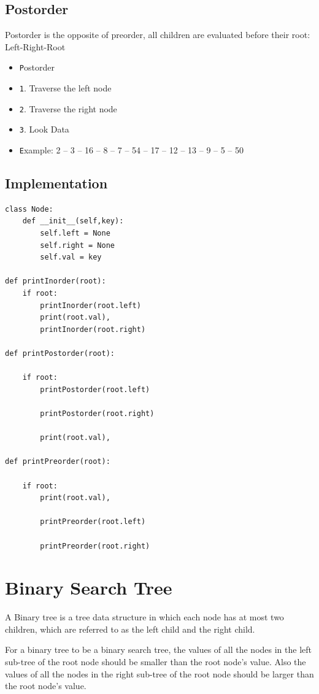 \documentclass[12pt]{article}
\begin{document}
    \subsection{Postorder}
    Postorder is the opposite of preorder, all children are evaluated before their root: Left-Right-Root
    \begin{itemize}
     \item \texttt Postorder
     \item \texttt 1. Traverse the left node
     \item \texttt 2. Traverse the right node 
     \item \texttt 3. Look Data
     \item \texttt Example: 2 – 3 – 16 – 8 – 7 – 54 – 17 – 12 – 13 – 9 – 5 – 50
    \end{itemize}
\subsection{Implementation}
 \begin{verbatim}
class Node: 
    def __init__(self,key): 
        self.left = None
        self.right = None
        self.val = key 

def printInorder(root): 
    if root: 
        printInorder(root.left) 
        print(root.val), 
        printInorder(root.right) 
  
def printPostorder(root): 
  
    if root: 
        printPostorder(root.left) 
  
        printPostorder(root.right) 
  
        print(root.val), 
  
def printPreorder(root): 
  
    if root: 
        print(root.val), 
  
        printPreorder(root.left) 
  
        printPreorder(root.right) 
\end{verbatim}


\section{Binary Search Tree}
 A Binary tree is a tree data structure in which each node has at most two children, which are referred to as the left child and the right child.
 
 For a binary tree to be a binary search tree, the values of all the nodes in the left sub-tree of the root node should be smaller than the root node's value. Also the values of all the nodes in the right sub-tree of the root node should be larger than the root node's value. \cite{4,5,13}
 
\end{document}
